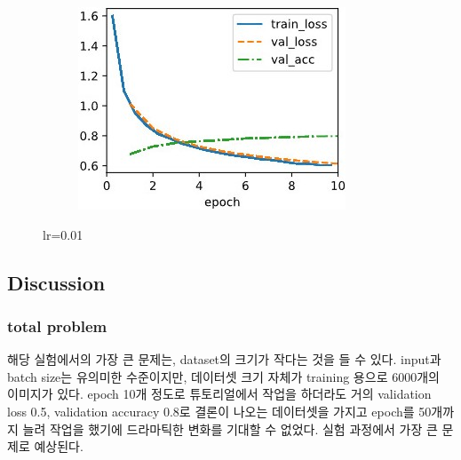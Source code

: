 \documentclass{article}
\begin{document}
\begin{figure}[ht]
\begin{center}
\begin{subfigure}[b]{0.3\columnwidth}
   \includegraphics[width=\columnwidth]{img/lr0.01 cosine0.03.jpg}
\end{subfigure}
\caption{lr=0.01}
\label{lr:0.01}
\end{center}
\end{figure}

\subsection{Discussion}
\subsubsection{total problem}
해당 실험에서의 가장 큰 문제는, dataset의 크기가 작다는 것을 들 수 있다. input과 batch size는 유의미한 수준이지만, 데이터셋 크기 자체가 training 용으로 6000개의 이미지가 있다. epoch 10개 정도로 튜토리얼에서 작업을 하더라도 거의 validation loss 0.5, validation accuracy 0.8로 결론이 나오는 데이터셋을 가지고 epoch를 50개까지 늘려 작업을 했기에 드라마틱한 변화를 기대할 수 없었다. 실험 과정에서 가장 큰 문제로 예상된다.
\end{document}
